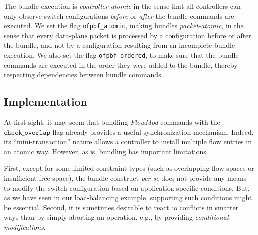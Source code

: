 \documentclass[conference]{sigcomm-alternate}
\newcommand{\checko}{\texttt{check\_overlap}\xspace}
\begin{document}



The bundle execution is \emph{controller-atomic}
in the sense that all controllers can only observe switch
configurations \emph{before} or \emph{after} the
bundle commands are executed.
We set the flag \texttt{ofpbf\_atomic},
making bundles \emph{packet-atomic},
in the sense that every data-plane packet is processed by a configuration
before or after the bundle, and not by a configuration resulting from
an incomplete bundle execution.
We also set the flag \texttt{ofpbf\_ordered},  to make sure that the
bundle commands are executed in the order they were added to the
bundle, thereby respecting dependencies between bundle commands.

\subsection{Implementation} 

At first sight, it may seem that bundling \emph{FlowMod} commands with  the $\checko$
flag already provides a useful synchronization mechanism.
Indeed, its ``mini-transaction'' nature allows a controller
to install multiple flow entries in an atomic way.
However, as is,
bundling has important limitations. %

First, %
except for some limited constraint types (such as
overlapping flow spaces or insufficient free space),
the bundle construct \emph{per se} 
does not provide any means to modify the switch configuration
based on application-specific conditions.
But, as we have seen in our load-balancing
example, supporting such conditions 
might be essential.
Second, it is sometimes desirable to react to conflicts in smarter ways than
by simply aborting an operation, e.g., by providing \emph{conditional modifications}.
\end{document}
